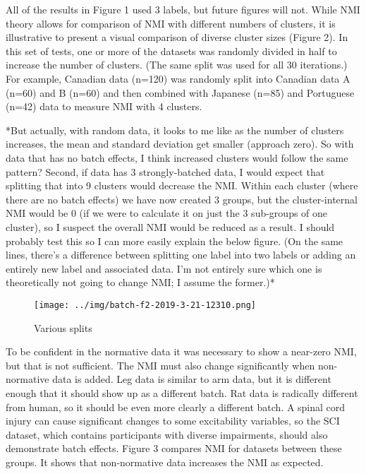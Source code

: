 \documentclass[12pt]{article}
\begin{document}
All of the results in Figure 1 used 3 labels, but future figures will not. While NMI theory allows for comparison of NMI with different numbers of clusters, it is illustrative to present a visual comparison of diverse cluster sizes (Figure 2). In this set of tests, one or more of the datasets was randomly divided in half to increase the number of clusters. (The same split was used for all 30 iterations.) For example, Canadian data (n=120) was randomly split into Canadian data A (n=60) and B (n=60) and then combined with Japanese (n=85) and Portuguese (n=42) data to measure NMI with 4 clusters.

*But actually, with random data, it looks to me like as the number of clusters increases, the mean and standard deviation get smaller (approach zero). So with data that has no batch effects, I think increased clusters would follow the same pattern? Second, if data has 3 strongly-batched data, I would expect that splitting that into 9 clusters would decrease the NMI. Within each cluster (where there are no batch effects) we have now created 3 groups, but the cluster-internal NMI would be 0 (if we were to calculate it on just the 3 sub-groups of one cluster), so I suspect the overall NMI would be reduced as a result. I should probably test this so I can more easily explain the below figure. (On the same lines, there's a difference between splitting one label into two labels or adding an entirely new label and associated data. I'm not entirely sure which one is theoretically not going to change NMI; I assume the former.)*

\begin{figure*}
  \centering
       \texttt{[image: ../img/batch-f2-2019-3-21-12310.png]}
  \caption{Various splits}
  \label{fig:MI}
\end{figure*}

To be confident in the normative data it was necessary to show a near-zero NMI, but that is not sufficient. The NMI must also change significantly when non-normative data is added. Leg data is similar to arm data, but it is different enough that it should show up as a different batch. Rat data is radically different from human, so it should be even more clearly a different batch. A spinal cord injury can cause significant changes to some excitability variables, so the SCI dataset, which contains participants with diverse impairments, should also demonstrate batch effects. Figure 3 compares NMI for datasets between these groups. It shows that non-normative data increases the NMI as expected.
\end{document}
